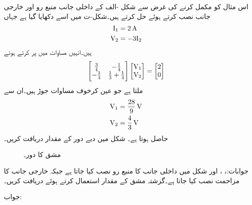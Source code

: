 اس مثال کو مکمل کرنے کی غرض سے  شکل -الف کے داخلی جانب منبع رو اور خارجی جانب  نصب کرتے ہوئے حل کرتے ہیں۔شکل-ت میں اسے دکھایا گیا ہے جہاں
\begin{align*}
{\ensuremath{{\textup{I}}}}_1&=\SI{2}{\ampere}\\
{{\textup{V}}}_2&=-3{{\textup{I}}}_2
\end{align*}
ہیں۔انہیں مساوات  میں پر کرتے ہوئے 
\begin{align*}
\begin{bmatrix}
\frac{3}{4} & -\frac{1}{4}\\
-\frac{1}{4}& \frac{1}{3}+\frac{1}{4}
\end{bmatrix}
\begin{bmatrix}
{\ensuremath{{\textup{V}}}}_1\\
{{\textup{V}}}_2
\end{bmatrix}
=
\begin{bmatrix}
2\\
0
\end{bmatrix}
\end{align*}
ملتا ہے جو عین کرخوف مساوات جوڑ ہیں۔ان سے 
\begin{align*}
{\ensuremath{{\textup{V}}}}_1&=\frac{28}{9}\, \si{\volt}\\
{{\textup{V}}}_2&=\frac{4}{3} \, \si{\volt}
\end{align*}
حاصل ہوتا ہے۔ 
شکل  میں دیے دور کے  مقدار دریافت کریں۔
\begin{figure}
\centering
{}
\caption{مشق  کا دور۔}
\label{شکل_نمونہ_مشق_الف}
\end{figure}

جوابات:، ،  اور 
شکل  میں داخلی جانب  کا منبع رو نصب کیا جاتا ہے جبکہ خارجی جانب  کا مزاحمت نصب کیا جاتا ہے۔گزشتہ مشق کے  مقدار استعمال کرتے ہوئے  دریافت کریں۔

جواب:

